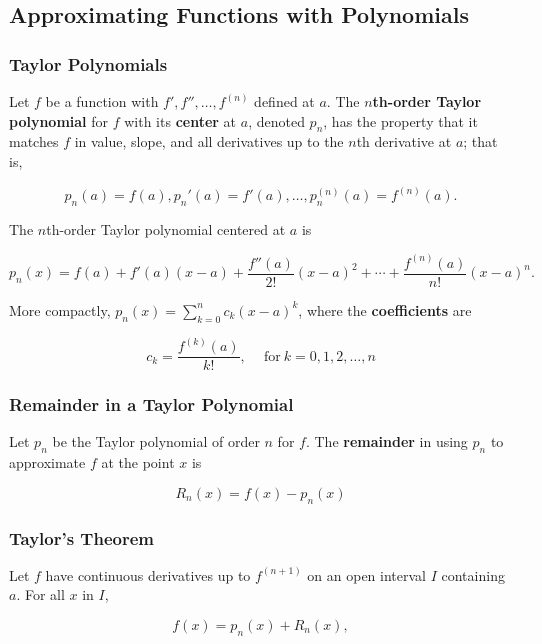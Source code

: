 \subsection{Approximating Functions with Polynomials}
\subsubsection{Taylor Polynomials}
Let $f$ be a function with $f', f'', \ldots , f ^{(n)}$ defined at $a$. The \textbf{$n$th-order Taylor polynomial} for $f$ with its \textbf{center} at $a$, denoted $p_n$, has the property that it matches $f$ in value, slope, and all derivatives up to the $n$th derivative at $a$; that is,

\begin{equation}
    p_n(a) = f(a), p_n'(a) = f'(a), \ldots,p_n^{(n)}(a) = f^{(n)}(a).
\end{equation}

The $n$th-order Taylor polynomial centered at $a$ is

\begin{equation}
    p_n(x) = f(a) + f'(a)(x - a) + \frac{f''(a)}{2!}(x - a)^2 + \cdots + \frac{f^{(n)}(a)}{n!}(x - a)^n.
\end{equation}

More compactly, $p_n(x) = \sum _{k = 0} ^{n}c_k(x - a)^k$, where the \textbf{coefficients} are

\begin{equation}
    c_k = \frac{f^{(k)}(a)}{k!}, \quad \ \text{for} \ k = 0, 1, 2, \ldots, n
\end{equation}

\subsubsection{Remainder in a Taylor Polynomial}
Let $p_n$ be the Taylor polynomial of order $n$ for $f$. The \textbf{remainder} in using $p_n$ to approximate $f$ at the point $x$ is

\begin{equation}
    R_n(x) = f(x) - p_n(x)
\end{equation}

\subsubsection{Taylor's Theorem}
Let $f$ have continuous derivatives up to $f^{(n + 1)} $ on an open interval $I$ containing $a$. For all $x$ in $I$,

\begin{equation}
    f(x) = p_n(x) + R_n(x),
\end{equation}


